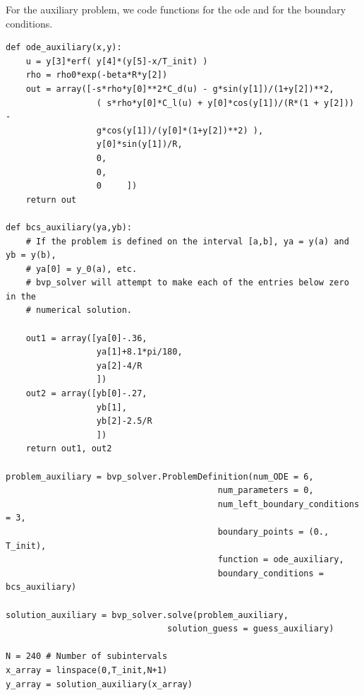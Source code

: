 For the auxiliary problem, we code functions for the ode and for the boundary conditions. 
\begin{lstlisting}
def ode_auxiliary(x,y):
	u = y[3]*erf( y[4]*(y[5]-x/T_init) )
	rho = rho0*exp(-beta*R*y[2])
	out = array([-s*rho*y[0]**2*C_d(u) - g*sin(y[1])/(1+y[2])**2,
				  ( s*rho*y[0]*C_l(u) + y[0]*cos(y[1])/(R*(1 + y[2])) - 
				  g*cos(y[1])/(y[0]*(1+y[2])**2) ),
				  y[0]*sin(y[1])/R,
				  0,
				  0,
				  0		])
	return out
	
def bcs_auxiliary(ya,yb):
	# If the problem is defined on the interval [a,b], ya = y(a) and yb = y(b), 
	# ya[0] = y_0(a), etc.
	# bvp_solver will attempt to make each of the entries below zero in the 
	# numerical solution.
	
	out1 = array([ya[0]-.36,
				  ya[1]+8.1*pi/180,
				  ya[2]-4/R
				  ])
	out2 = array([yb[0]-.27,
				  yb[1],
				  yb[2]-2.5/R
				  ])
	return out1, out2

problem_auxiliary = bvp_solver.ProblemDefinition(num_ODE = 6,
										  num_parameters = 0,
										  num_left_boundary_conditions = 3,
										  boundary_points = (0., T_init),
										  function = ode_auxiliary,
										  boundary_conditions = bcs_auxiliary)
									
solution_auxiliary = bvp_solver.solve(problem_auxiliary,
								solution_guess = guess_auxiliary)
								
N = 240 # Number of subintervals
x_array = linspace(0,T_init,N+1)
y_array = solution_auxiliary(x_array)
	
\end{lstlisting}


